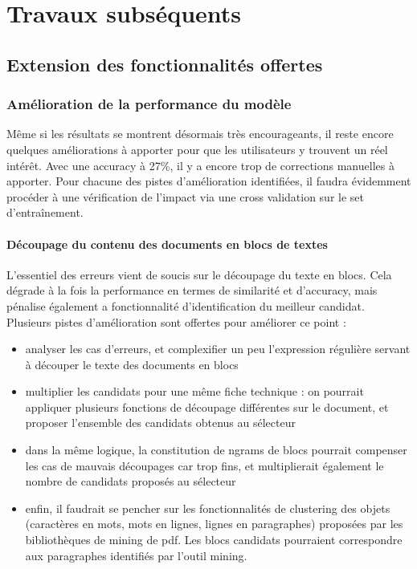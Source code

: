 \part{Travaux subséquents}

\chapter{Extension des fonctionnalités offertes}

    \section{Amélioration de la performance du modèle}

    Même si les résultats se montrent désormais très encourageants, il reste encore quelques améliorations à apporter pour que les utilisateurs y trouvent un réel intérêt.
    Avec une accuracy à 27\%, il y a encore trop de corrections manuelles à apporter.
    Pour chacune des pistes d'amélioration identifiées, il faudra évidemment procéder à une vérification de l'impact via une cross validation sur le set d'entraînement.

    \subsection{Découpage du contenu des documents en blocs de textes}

    L'essentiel des erreurs vient de soucis sur le découpage du texte en blocs.
    Cela dégrade à la fois la performance en termes de similarité et d'accuracy, mais pénalise également a fonctionnalité d'identification du meilleur candidat.
    Plusieurs pistes d'amélioration sont offertes pour améliorer ce point : 
    \begin{itemize}
        \item analyser les cas d'erreurs, et complexifier un peu l'expression régulière servant à découper le texte des documents en blocs
        \item multiplier les candidats pour une même fiche technique : on pourrait appliquer plusieurs fonctions de découpage différentes sur le document, et proposer l'ensemble des candidats obtenus au sélecteur
        \item dans la même logique, la constitution de \og ngrams de blocs \fg pourrait compenser les cas de mauvais découpages car trop fins, et multiplierait également le nombre de candidats proposés au sélecteur
        \item enfin, il faudrait se pencher sur les fonctionnalités de clustering des objets (caractères en mots, mots en lignes, lignes en paragraphes) proposées par les bibliothèques de mining de pdf. Les blocs candidats pourraient correspondre aux paragraphes identifiés par l'outil mining.
    \end{itemize}

